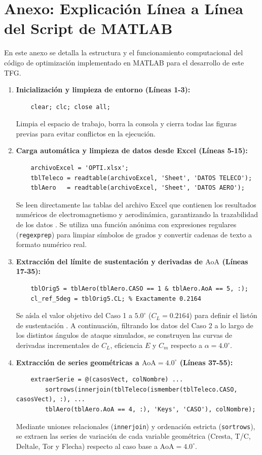 \documentclass[11pt, a4paper]{article}
\begin{document}
\newpage

\appendix
\section{Anexo: Explicación Línea a Línea del Script de MATLAB}
En este anexo se detalla la estructura y el funcionamiento computacional del código de optimización implementado en MATLAB para el desarrollo de este TFG.

\begin{enumerate}
    \item \textbf{Inicialización y limpieza de entorno (Líneas 1-3):}
    \begin{lstlisting}
    clear; clc; close all;
    \end{lstlisting}
    Limpia el espacio de trabajo, borra la consola y cierra todas las figuras previas para evitar conflictos en la ejecución.

    \item \textbf{Carga automática y limpieza de datos desde Excel (Líneas 5-15):}
    \begin{lstlisting}
    archivoExcel = 'OPTI.xlsx';
    tblTeleco = readtable(archivoExcel, 'Sheet', 'DATOS TELECO');
    tblAero   = readtable(archivoExcel, 'Sheet', 'DATOS AERO');
    \end{lstlisting}
    Se leen directamente las tablas del archivo Excel que contienen los resultados numéricos de electromagnetismo y aerodinámica, garantizando la trazabilidad de los datos \cite{anderson}. Se utiliza una función anónima con expresiones regulares (\texttt{regexprep}) para limpiar símbolos de grados y convertir cadenas de texto a formato numérico real.

    \item \textbf{Extracción del límite de sustentación y derivadas de $\text{AoA}$ (Líneas 17-35):}
    \begin{lstlisting}
    tblOrig5 = tblAero(tblAero.CASO == 1 & tblAero.AoA == 5, :);
    cl_ref_5deg = tblOrig5.CL; % Exactamente 0.2164
    \end{lstlisting}
    Se aísla el valor objetivo del Caso 1 a $5.0^\circ$ ($C_L = 0.2164$) para definir el listón de sustentación \cite{anderson}. A continuación, filtrando los datos del Caso 2 a lo largo de los distintos ángulos de ataque simulados, se construyen las curvas de derivadas incrementales de $C_L$, eficiencia $E$ y $C_m$ respecto a $\alpha = 4.0^\circ$.

    \item \textbf{Extracción de series geométricas a $\text{AoA} = 4.0^\circ$ (Líneas 37-55):}
    \begin{lstlisting}
    extraerSerie = @(casosVect, colNombre) ...
        sortrows(innerjoin(tblTeleco(ismember(tblTeleco.CASO, casosVect), :), ...
        tblAero(tblAero.AoA == 4, :), 'Keys', 'CASO'), colNombre);
    \end{lstlisting}
    Mediante uniones relacionales (\texttt{innerjoin}) y ordenación estricta (\texttt{sortrows}), se extraen las series de variación de cada variable geométrica (Cresta, T/C, Deltale, Tor y Flecha) respecto al caso base a $\text{AoA} = 4.0^\circ$.


\end{enumerate}
\end{document}

